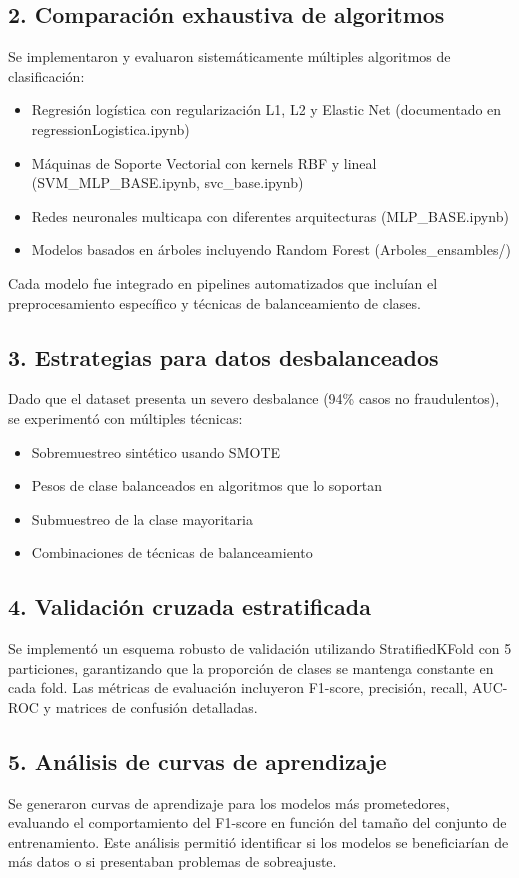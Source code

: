 \documentclass{llncs}
\begin{document}
\subsection{2. Comparación exhaustiva de algoritmos}
Se implementaron y evaluaron sistemáticamente múltiples algoritmos de clasificación:
\begin{itemize}
    \item Regresión logística con regularización L1, L2 y Elastic Net (documentado en regressionLogistica.ipynb)
    \item Máquinas de Soporte Vectorial con kernels RBF y lineal (SVM\_MLP\_BASE.ipynb, svc\_base.ipynb)
    \item Redes neuronales multicapa con diferentes arquitecturas (MLP\_BASE.ipynb)
    \item Modelos basados en árboles incluyendo Random Forest (Arboles\_ensambles/)
\end{itemize}

Cada modelo fue integrado en pipelines automatizados que incluían el preprocesamiento específico y técnicas de balanceamiento de clases.

\subsection{3. Estrategias para datos desbalanceados}
Dado que el dataset presenta un severo desbalance (94\% casos no fraudulentos), se experimentó con múltiples técnicas:
\begin{itemize}
    \item Sobremuestreo sintético usando SMOTE
    \item Pesos de clase balanceados en algoritmos que lo soportan
    \item Submuestreo de la clase mayoritaria
    \item Combinaciones de técnicas de balanceamiento
\end{itemize}

\subsection{4. Validación cruzada estratificada}
Se implementó un esquema robusto de validación utilizando StratifiedKFold con 5 particiones, garantizando que la proporción de clases se mantenga constante en cada fold. Las métricas de evaluación incluyeron F1-score, precisión, recall, AUC-ROC y matrices de confusión detalladas.

\subsection{5. Análisis de curvas de aprendizaje}
Se generaron curvas de aprendizaje para los modelos más prometedores, evaluando el comportamiento del F1-score en función del tamaño del conjunto de entrenamiento. Este análisis permitió identificar si los modelos se beneficiarían de más datos o si presentaban problemas de sobreajuste.
\end{document}
